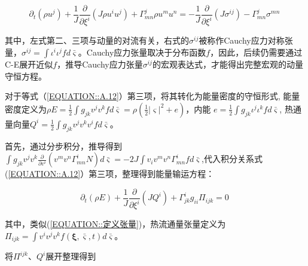 \documentclass[MathematicsNumericsDerivationsAndOpenFOAM.tex]{subfiles}
\begin{document}
\begin{equation}
  \boxed{
    \partial_{t}\left(\rho u^{j}\right)+\frac{1}{J} \frac{\partial}{\partial \xi^{i}}\left(J \rho u^{i} u^{j} \right)+\Gamma_{mn}^{j} \rho u^{m} u^{n} = - \frac{1}{J} \frac{\partial}{\partial \xi^{i}}\left(J \sigma^{ij} \right) -\Gamma_{mn}^{j} \sigma^{mn}
  }
  \label{动量方程输运形式} ~
\end{equation}
%



其中，左式第二、三项与动量的对流有关，右式的$\sigma^{i j}$被称作Cauchy应力对称张量，$\sigma^{i j}=\int \iota^{i} \iota^{j} f  d \bar{\varsigma}$。Cauchy应力张量取决于分布函数$f$，因此，后续仍需要通过C-E展开近似$f$，推导Cauchy应力张量$\sigma^{i j}$的宏观表达式，才能得出完整宏观的动量守恒方程。
%
%

对于等式（\ref{EQUATION::A.12}）第三项，将其转化为能量密度的守恒形式, 能量密度定义为$\rho E= \frac{1}{2}\int g_{jk} v^{j}v^{k} f d\bar{\varsigma} =\rho (\frac{1}{2}|\boldsymbol{\varsigma}|^2+e)$，内能 $e=\frac{1}{2}\int g_{jk} \iota^{j} \iota^{k} f  d \bar{\varsigma}$, 热通量向量$Q^i=\frac{1}{2}\int g_{jk}v^{j} v^{k} v^{i} fd \bar{\varsigma}$。

首先，通过分步积分，推导得到$\int g_{jk} v^{j}v^{k}  \frac{\partial}{\partial v^{i}}\left( v^{m} v^{n} \Gamma_{mn}^{i} N\right)d \bar{\varsigma}=-2J\int v_i v^mv^n \Gamma_{mn}^i f d \bar{\varsigma}$,代入积分关系式(\ref{EQUATION::A.12}）第三项，整理得到能量输运方程：

\begin{equation}
  \boxed{
  \partial_{t}\left(\rho E\right)  + \frac{1}{J} \frac{\partial}{\partial \xi^{i}}\left(J Q^i \right) + \Gamma^i_{ j k}g_{ii}\Pi_{ij k}=0
  }
  \label{能量输运1} ~
\end{equation}
%

其中，类似(\ref{EQUATION::定义张量})，热流通量张量定义为$\Pi_{i j k}= \int  v^{i} v^{j} v^{k} f(\boldsymbol{\xi}, \bar{\varsigma}, t) d \bar{\varsigma}$。



将$\Pi^{i j k}$、$Q^i$展开整理得到
\end{document}
